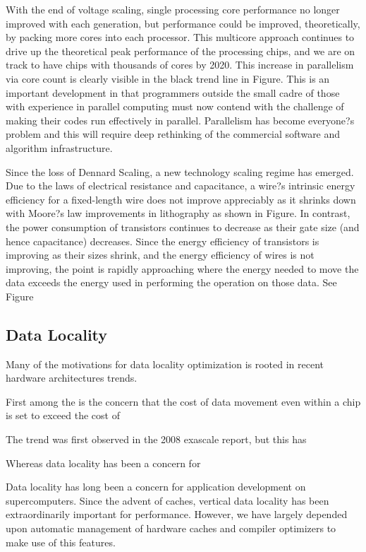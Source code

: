 With the end of voltage scaling, single processing core performance no longer improved with each generation, but performance could be improved, theoretically, by packing more cores into each processor. This multicore approach continues to drive up the theoretical peak performance of the processing chips, and we are on track to have chips with thousands of cores by 2020.  This increase in parallelism via core count is clearly visible in the black trend line in Figure.  This is an important development in that programmers outside the small cadre of those with experience in parallel computing must now contend with the challenge of making their codes run effectively in parallel. Parallelism has become everyone?s problem and this will require deep rethinking of the commercial software and algorithm infrastructure. 

Since the loss of Dennard Scaling, a new technology scaling regime has emerged. Due to the laws of electrical resistance and capacitance, a wire?s intrinsic energy efficiency for a fixed-length wire does not improve appreciably as it shrinks down with Moore?s law improvements in lithography as shown in Figure. In contrast, the power consumption of transistors continues to decrease as their gate size (and hence capacitance) decreases. Since the energy efficiency of transistors is improving as their sizes shrink, and the energy efficiency of wires is not improving, the point is rapidly approaching where the energy needed to move the data exceeds the energy used in performing the operation on those data.  See Figure

\subsection{Data Locality}
Many of the motivations for data locality optimization is rooted in recent hardware architectures trends. 

First among the is the concern that the cost of data movement even within a chip is set to exceed the cost of 

The trend was first observed in the 2008 exascale report, but this has 

Whereas data locality has been a concern for 

Data locality has long been a concern for application development on supercomputers.  Since the advent of caches, vertical data locality has been extraordinarily important for performance.  However, we have largely depended upon automatic management of hardware caches and compiler optimizers to make use of this features.

